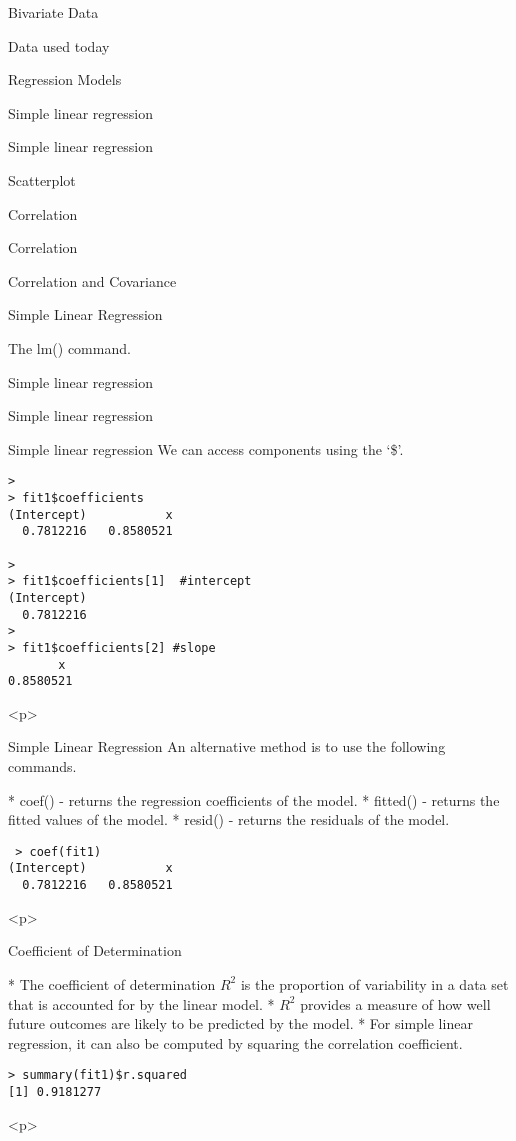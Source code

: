 \begin{slide}{Bivariate Data}
\begin{slide}{Data used today}
\begin{slide}{Regression Models}
\begin{slide}{Simple linear regression}
\begin{slide}{Simple linear regression}
\begin{slide}{Scatterplot}
\begin{slide}{Correlation}
\begin{slide}{Correlation}
\begin{slide}{Correlation and Covariance}
\begin{slide}{Simple Linear Regression}
\begin{slide}{The lm() command.}
\begin{slide}{Simple linear regression}
\begin{slide}{Simple linear regression}
\begin{slide}{Simple linear regression}
We can access components using the `\$'.
\begin{verbatim}
>
> fit1$coefficients
(Intercept)           x
  0.7812216   0.8580521

>
> fit1$coefficients[1]  #intercept
(Intercept)
  0.7812216
>
> fit1$coefficients[2] #slope
       x
0.8580521
\end{verbatim}

<p>

\begin{slide}{Simple Linear Regression}
An alternative method is to use the following commands.
\begin{itemize}
* coef() - returns the regression coefficients of the model.
* fitted() - returns the fitted values of the model.
* resid() - returns the residuals of the model.


\end{itemize}
 \begin{verbatim}
 > coef(fit1)
(Intercept)           x
  0.7812216   0.8580521
\end{verbatim}


<p>


\begin{slide}{Coefficient of Determination}
\begin{itemize}
* The coefficient of determination $R^2$ is  the proportion of variability in a data set
that is accounted for by the linear model.
* $R^2$ provides a measure of how well future outcomes are likely to be predicted by the model.
* For simple linear regression, it can also be computed by squaring the correlation coefficient.
\end{itemize}

\begin{verbatim}
> summary(fit1)$r.squared
[1] 0.9181277
\end{verbatim}


<p>



\end{slide}
\end{slide}
\end{slide}
\end{slide}
\end{slide}
\end{slide}
\end{slide}
\end{slide}
\end{slide}
\end{slide}
\end{slide}
\end{slide}
\end{slide}
\end{slide}
\end{slide}
\end{slide}
